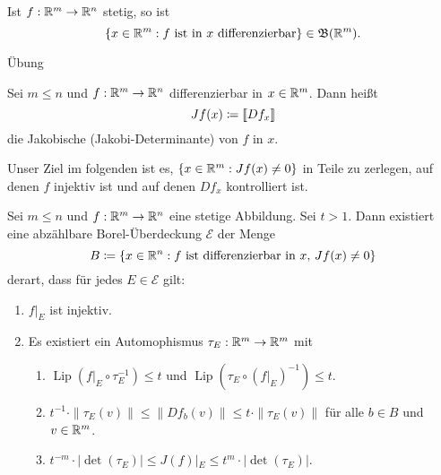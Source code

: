 \documentclass[a4paper,twoside,DIV15,BCOR12mm]{scrbook}
\newcommand{\borel}{\mathfrak B}
\DeclareMathOperator{\Lip}{Lip}
\begin{document}
\begin{lemma}
\label{lem:3.6}
Ist $f:\mathbb{R}^m\to\mathbb{R}^n$ stetig, so ist
\[
\{ x\in\MdR^m: f \text{ ist in $x$ differenzierbar}\} \in\borel(\MdR^m).
\]
\end{lemma}

\begin{beweis}
Übung
\end{beweis}

\begin{definition}
Sei $m\le n$ und $f:\mathbb{R}^m\to\mathbb{R}^n$ differenzierbar in $x\in\mathbb{R}^m$. Dann heißt
\[
Jf(x) \da \llbracket Df_x \rrbracket
\]
die Jakobische (Jakobi-Determinante) von $f$ in $x$.
\end{definition}

Unser Ziel im folgenden ist es, $\{x\in\mathbb{R}^m: Jf(x) \ne 0\}$ in Teile zu zerlegen, auf denen $f$ injektiv ist und auf denen $Df_x$ kontrolliert ist.

\begin{lemma}
\label{lem:3.7}
Sei $m\le n$ und $f:\mathbb{R}^m\to\mathbb{R}^n$ eine stetige Abbildung. Sei $t>1$. Dann existiert eine abzählbare Borel-Überdeckung $\mathcal E$ der Menge
\[
B \da \{x\in\MdR^n: f \text{ ist differenzierbar in $x$, } Jf(x) \ne 0\}
\]
derart, dass für jedes $E\in\mathcal E$ gilt:
\begin{enumerate}
\item $f|_E$ ist injektiv.
\item Es existiert ein Automophismus $\tau_E : \mathbb{R}^m \to \mathbb{R}^m$ mit 
\begin{enumerate}
\item $\Lip(f|_E \circ \tau_E^{-1}) \le t$ und $\Lip(\tau_E \circ (f|_E)^{-1}) \le t$.
\item $t^{-1} \cdot\|\tau_E(v)\| \le \|Df_b(v)\| \le t \cdot\|\tau_E(v)\|$ für alle $b\in B$ und $v\in \mathbb{R}^m$.
\item $t^{-m} \cdot |\det(\tau_E)| \le J(f)|_E \le t^m \cdot |\det(\tau_E)|$.
\end{enumerate}
\end{enumerate}
\end{lemma}
\end{document}
